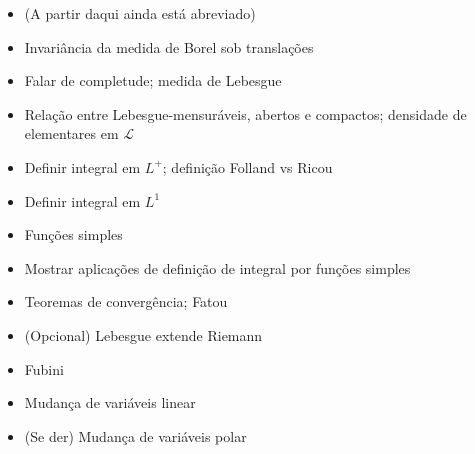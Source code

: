 \documentclass{article}
\begin{document}
\begin{itemize}
\item (A partir daqui ainda está abreviado)

\item Invariância da medida de Borel sob translações
\item Falar de completude; medida de Lebesgue
\item Relação entre Lebesgue-mensuráveis, abertos e compactos; densidade de elementares em $\mathcal{L}$

\item Definir integral em $L^+$; definição Folland vs Ricou
\item Definir integral em $L^1$
\item Funções simples
\item Mostrar aplicações de definição de integral por funções simples
\item Teoremas de convergência; Fatou
\item (Opcional) Lebesgue extende Riemann
\item Fubini
\item Mudança de variáveis linear

\item (Se der) Mudança de variáveis polar
\end{itemize}
\end{document}
